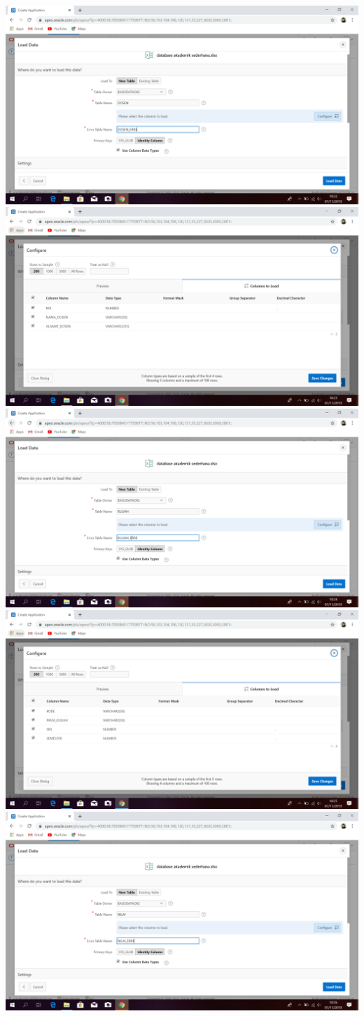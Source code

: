 \documentclass{article}
\begin{document}
\begin{enumerate}
\begin{enumerate}
\begin{center}
    \includegraphics[width=.8\textwidth]{figure/8.PNG}
    \includegraphics[width=.8\textwidth]{figure/9.PNG}
    \includegraphics[width=.8\textwidth]{figure/10.PNG}
    \includegraphics[width=.8\textwidth]{figure/11.PNG}
    \includegraphics[width=.8\textwidth]{figure/12.PNG}

\end{center}
\end{enumerate}
\end{enumerate}
\end{document}
